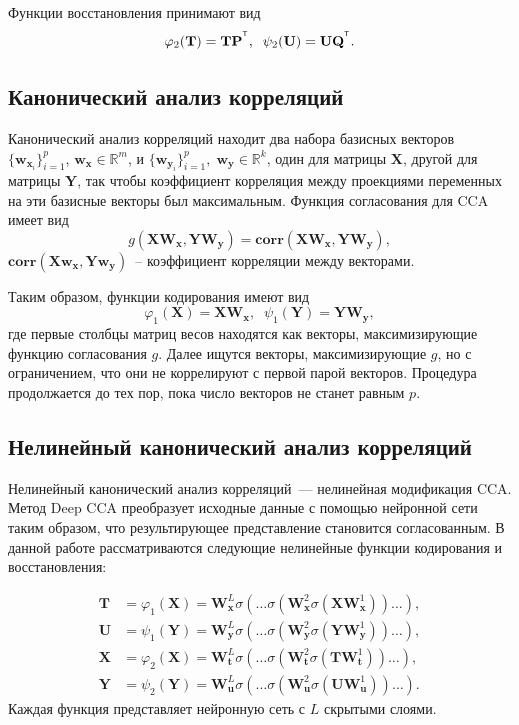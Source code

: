 \documentclass[12pt]{article}
\newcommand{\bx}{\mathbf{x}}
\newcommand{\by}{\mathbf{y}}
\newcommand{\bw}{\mathbf{w}}
\newcommand{\bY}{\mathbf{Y}}
\newcommand{\bX}{\mathbf{X}}
\newcommand{\bu}{\mathbf{u}}
\newcommand{\bt}{\mathbf{t}}
\newcommand{\bP}{\mathbf{P}}
\newcommand{\bT}{\mathbf{T}}
\newcommand{\bQ}{\mathbf{Q}}
\newcommand{\bU}{\mathbf{U}}
\newcommand{\bW}{\mathbf{W}}
\newcommand{\T}{^{\text{\tiny\sffamily\upshape\mdseries T}}}
\begin{document}
Функции восстановления принимают вид
\begin{equation*}
	\varphi_2(\bT) = \bT\bP^{\T}, \;\;
	\psi_2(\bU) = \bU \bQ^{\T}.
\end{equation*} 

\subsection{Канонический анализ корреляций}

Канонический анализ корреляций находит два набора базисных векторов $\{\bw_{\bx_i}\}_{i=1}^{p}$, $\bw_{\bx} \in \mathbb{R}^{m}$, и $\{\bw_{\by_i}\}_{i=1}^{p}, \; \bw_{\by} \in \mathbb{R}^{k}$, один для матрицы $\bX$, другой для матрицы $\bY$, так чтобы коэффициент корреляция между проекциями переменных на эти базисные векторы был максимальным. Функция согласования для CCA имеет вид
\begin{equation*}
	g(\bX \bW_{\bx}, \bY \bW_{\by}) = \textbf{corr}(\bX \bW_{\bx}, \bY \bW_{\by}),
\end{equation*} 
 $\textbf{corr}(\bX \bw_{\bx}, \bY \bw_{\by})$~-- коэффициент корреляции между векторами.

Таким образом, функции кодирования имеют вид
\begin{equation*}
	\varphi_1(\bX) = \bX \bW_{\bx} , \;\;
	\psi_1(\bY) = \bY \bW_{\by},
\end{equation*}
где первые столбцы матриц весов находятся как векторы, максимизирующие функцию согласования $g$. Далее ищутся векторы, максимизирующие $g$, но с ограничением, что они не коррелируют с первой парой векторов. Процедура продолжается до тех пор, пока число векторов не станет равным $p$. 

\subsection{Нелинейный канонический анализ корреляций}

Нелинейный канонический анализ корреляций~--- нелинейная модификация CCA. Метод Deep CCA преобразует исходные данные с помощью нейронной сети таким образом, что результирующее представление становится согласованным. В данной работе рассматриваются следующие нелинейные функции кодирования и восстановления:

\begin{align*}
	\bT &= \varphi_1(\bX) =  \bW_\bx^L \sigma(\dots \sigma(\bW_\bx^2 \sigma(\bX \bW_\bx^1)) \dots ), \\
	\bU &= \psi_1(\bY) =  \bW_\by^L \sigma(\dots \sigma(\bW_\by^2 \sigma(\bY \bW_\by^1)) \dots ), \\
	\bX &= \varphi_2(\bX) =  \bW_\bt^L \sigma(\dots \sigma(\bW_\bt^2 \sigma(\bT \bW_\bt^1)) \dots ), \\
	\bY &= \psi_2(\bY) =  \bW_\bu^L \sigma(\dots \sigma(\bW_\bu^2 \sigma(\bU \bW_\bu^1)) \dots ).
\end{align*}
Каждая функция представляет нейронную сеть с $L$ скрытыми слоями. 
\end{document}
